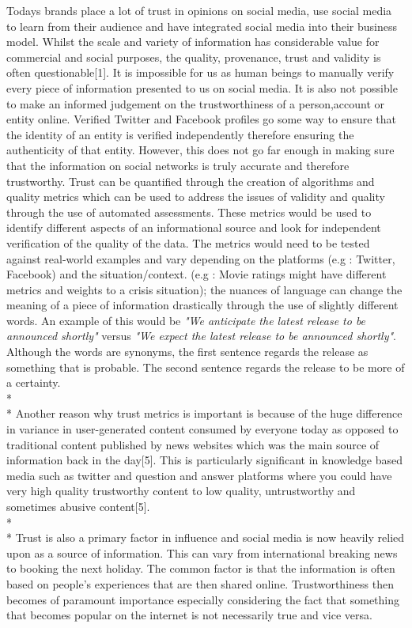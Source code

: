 Todays brands place a lot of trust in opinions on social media, use social media to learn from their audience and have integrated social media into their business model. Whilst the scale and variety of information has considerable value for commercial and social purposes, the quality, provenance, trust and validity is often questionable[1]. It is impossible for us as human beings to manually verify every piece of information presented to us on social media. It is also not possible to make an informed judgement on the trustworthiness of a person,account or entity online. Verified Twitter and Facebook profiles go some way to ensure that the identity of an entity is verified independently therefore ensuring the authenticity of that entity. However, this does not go far enough in making sure that the information on social networks is truly accurate and therefore trustworthy. Trust can be quantified through the creation of algorithms and quality metrics which can be used to address the issues of validity and quality through the use of automated assessments. These metrics would be used to identify different aspects of an informational source and look for independent verification of the quality of the data. The metrics would need to be tested against real-world examples and vary depending on the platforms (e.g : Twitter, Facebook) and the situation/context. (e.g : Movie ratings might have different metrics and weights to a crisis situation); the nuances of language can change the meaning of a piece of information drastically through the use of slightly different words. An example of this would be \textsl{"We anticipate the latest release to be announced shortly"} versus \textsl{"We expect the latest release to be announced shortly"}. Although the words are synonyms, the first sentence regards the release as something that is probable. The second sentence regards the release to be more of a certainty.
\\*\\*
Another reason why trust metrics is important is because of the huge difference in variance in user-generated content consumed by everyone today as opposed to traditional content published by news websites which was the main source of information back in the day[5]. This is particularly significant in knowledge based media such as twitter and question and answer platforms where you could have very high quality trustworthy content to low quality, untrustworthy and sometimes abusive content[5].\\*\\*
Trust is also a primary factor in influence and social media is now heavily relied upon as a source of information. This can vary from international breaking news to booking the next holiday. The common factor is that the information is often based on people's experiences that are then shared online. Trustworthiness then becomes of paramount importance especially considering the fact that something that becomes popular on the internet is not necessarily true and vice versa. 
